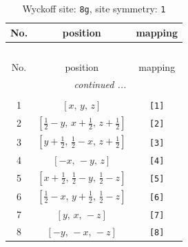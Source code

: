 \documentclass[fleqn,8pt]{jsarticle}
\begin{document}
\renewcommand{\arraystretch}{1.2}
\begin{longtable}{ccc}
\caption{Wyckoff site: {\tt 8g}, site symmetry: {\tt 1}}
 \\
 \hline \hline
No. & position & mapping \\ \hline \endfirsthead

\multicolumn{2}{l}{\tablename\ \thetable{}} \\
 \hline \hline
No. & position & mapping \\ \hline \endhead

 \hline \hline
\multicolumn{2}{r}{\footnotesize\it continued ...} \\ \endfoot

 \hline \hline
\multicolumn{2}{r}{} \\ \endlastfoot

1 & $\left[ x,\, y,\, z \right]$ & {\tt [1]} \\ \hline
2 & $\left[ \frac{1}{2} - y,\, x + \frac{1}{2},\, z + \frac{1}{2} \right]$ & {\tt [2]} \\ \hline
3 & $\left[ y + \frac{1}{2},\, \frac{1}{2} - x,\, z + \frac{1}{2} \right]$ & {\tt [3]} \\ \hline
4 & $\left[ - x,\, - y,\, z \right]$ & {\tt [4]} \\ \hline
5 & $\left[ x + \frac{1}{2},\, \frac{1}{2} - y,\, \frac{1}{2} - z \right]$ & {\tt [5]} \\ \hline
6 & $\left[ \frac{1}{2} - x,\, y + \frac{1}{2},\, \frac{1}{2} - z \right]$ & {\tt [6]} \\ \hline
7 & $\left[ y,\, x,\, - z \right]$ & {\tt [7]} \\ \hline
8 & $\left[ - y,\, - x,\, - z \right]$ & {\tt [8]} \\
\end{longtable}
\end{document}
